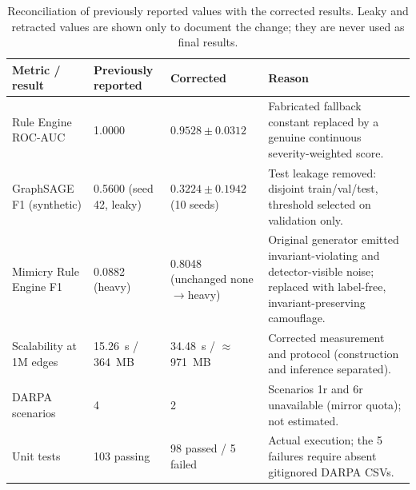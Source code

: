 \begin{table}[t]
\centering
\small
\caption{Reconciliation of previously reported values with the corrected
results. Leaky and retracted values are shown only to document the change; they
are never used as final results.}
\label{tab:reconciliation}
\begin{tabular}{p{3.4cm}p{3.0cm}p{3.2cm}p{5.6cm}}
\toprule
Metric / result & Previously reported & Corrected & Reason \\
\midrule
Rule Engine ROC-AUC & 1.0000 & $0.9528\pm0.0312$ & Fabricated fallback constant replaced by a genuine continuous severity-weighted score. \\
GraphSAGE F1 (synthetic) & 0.5600 (seed 42, leaky) & $0.3224\pm0.1942$ (10 seeds) & Test leakage removed: disjoint train/val/test, threshold selected on validation only. \\
Mimicry Rule Engine F1 & 0.0882 (heavy) & 0.8048 (unchanged none$\to$heavy) & Original generator emitted invariant-violating and detector-visible noise; replaced with label-free, invariant-preserving camouflage. \\
Scalability at 1M edges & 15.26~s / 364~MB & 34.48~s / $\approx$971~MB & Corrected measurement and protocol (construction and inference separated). \\
DARPA scenarios & 4 & 2 & Scenarios 1r and 6r unavailable (mirror quota); not estimated. \\
Unit tests & 103 passing & 98 passed / 5 failed & Actual execution; the 5 failures require absent gitignored DARPA CSVs. \\
\bottomrule
\end{tabular}
\end{table}
